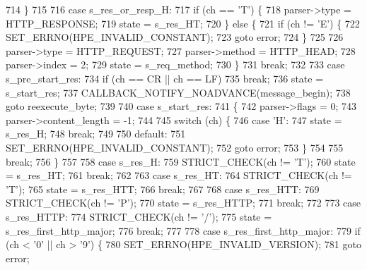 \begin{DoxyCode}
714       \}
715 
716       \textcolor{keywordflow}{case} s_res_or_resp_H:
717         \textcolor{keywordflow}{if} (ch == \textcolor{charliteral}{'T'}) \{
718           parser->type = HTTP_RESPONSE;
719           state = s_res_HT;
720         \} \textcolor{keywordflow}{else} \{
721           \textcolor{keywordflow}{if} (ch != \textcolor{charliteral}{'E'}) \{
722             SET_ERRNO(HPE_INVALID_CONSTANT);
723             \textcolor{keywordflow}{goto} error;
724           \}
725 
726           parser->type = HTTP_REQUEST;
727           parser->method = HTTP_HEAD;
728           parser->index = 2;
729           state = s_req_method;
730         \}
731         \textcolor{keywordflow}{break};
732 
733       \textcolor{keywordflow}{case} s_pre_start_res:
734         \textcolor{keywordflow}{if} (ch == CR || ch == LF)
735           \textcolor{keywordflow}{break};
736         state = s_start_res;
737         CALLBACK_NOTIFY_NOADVANCE(message\_begin);
738         \textcolor{keywordflow}{goto} reexecute\_byte;
739 
740       \textcolor{keywordflow}{case} s_start_res:
741       \{
742         parser->flags = 0;
743         parser->content_length = -1;
744 
745         \textcolor{keywordflow}{switch} (ch) \{
746           \textcolor{keywordflow}{case} \textcolor{charliteral}{'H'}:
747             state = s_res_H;
748             \textcolor{keywordflow}{break};
749 
750           \textcolor{keywordflow}{default}:
751             SET_ERRNO(HPE_INVALID_CONSTANT);
752             \textcolor{keywordflow}{goto} error;
753         \}
754 
755         \textcolor{keywordflow}{break};
756       \}
757 
758       \textcolor{keywordflow}{case} s_res_H:
759         STRICT_CHECK(ch != \textcolor{charliteral}{'T'});
760         state = s_res_HT;
761         \textcolor{keywordflow}{break};
762 
763       \textcolor{keywordflow}{case} s_res_HT:
764         STRICT_CHECK(ch != \textcolor{charliteral}{'T'});
765         state = s_res_HTT;
766         \textcolor{keywordflow}{break};
767 
768       \textcolor{keywordflow}{case} s_res_HTT:
769         STRICT_CHECK(ch != \textcolor{charliteral}{'P'});
770         state = s_res_HTTP;
771         \textcolor{keywordflow}{break};
772 
773       \textcolor{keywordflow}{case} s_res_HTTP:
774         STRICT_CHECK(ch != \textcolor{charliteral}{'/'});
775         state = s_res_first_http_major;
776         \textcolor{keywordflow}{break};
777 
778       \textcolor{keywordflow}{case} s_res_first_http_major:
779         \textcolor{keywordflow}{if} (ch < '0' || ch > \textcolor{charliteral}{'9'}) \{
780           SET_ERRNO(HPE_INVALID_VERSION);
781           \textcolor{keywordflow}{goto} error;

\end{DoxyCode}
